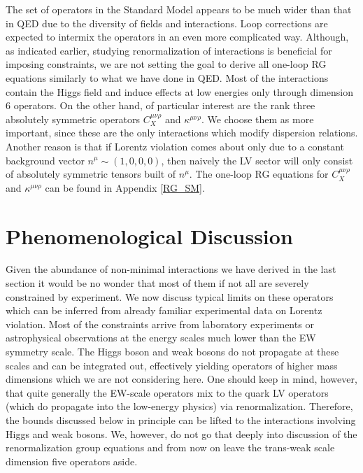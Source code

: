 \documentclass[12pt]{revtex4}
\begin{document}
	The set of operators in the Standard Model appears to be much
	wider than that in QED due to the diversity of fields and interactions.
	Loop corrections are expected to intermix the operators in an 
	even more complicated way.
	Although, as indicated earlier, studying renormalization of interactions
	is beneficial for imposing constraints,
	we are not setting the goal to derive all one-loop RG
	equations similarly to what we have done in QED.
	Most of the interactions contain the Higgs field and induce effects
	at low energies only through dimension 6 operators. 
	On the other hand, of particular interest are
	the rank three absolutely
	symmetric operators $ C_X^{\mu\nu\rho} $ 
	and $ \kappa^{\mu\nu\rho} $.
	We choose them as more important, since these are the only interactions
	which modify dispersion relations.
	Another reason is that if Lorentz violation comes about only 
	due to a constant background vector $ n^{\mu} \sim (1, 0, 0, 0) $,
	then naively the LV sector will only consist of absolutely symmetric
	tensors built of $ n^\mu $.
	The one-loop RG equations for $ C_X^{\mu\nu\rho} $ 
	and $ \kappa^{\mu\nu\rho} $ can be found in Appendix \ref{RG_SM}.


%
%
\section{Phenomenological Discussion}
\label{phenomenology}
	
	Given the abundance of non-minimal interactions we have derived in 
	the last section it would be no wonder that most of them if not all
	are severely constrained by experiment.
	We now discuss typical limits on these operators 
	which can be inferred from already familiar experimental data
	on Lorentz violation.
	Most of the constraints arrive from laboratory experiments
	or astrophysical observations at the energy scales much lower
	than the EW symmetry scale. 
	The Higgs boson and weak bosons do not propagate 
	at these scales and can be integrated out, effectively yielding operators of 
	higher mass dimensions which we are not considering here.
	One should keep in mind, however, that quite generally the EW-scale operators 
	mix to the quark LV operators (which do propagate into the low-energy
	physics) via renormalization. 
	Therefore, the bounds discussed below in principle can be lifted to the 
	interactions involving Higgs and weak bosons. 
	We, however, do not go that deeply into discussion of the renormalization
	group equations and from now on leave the trans-weak scale dimension five 
	operators aside.
	
\end{document}
